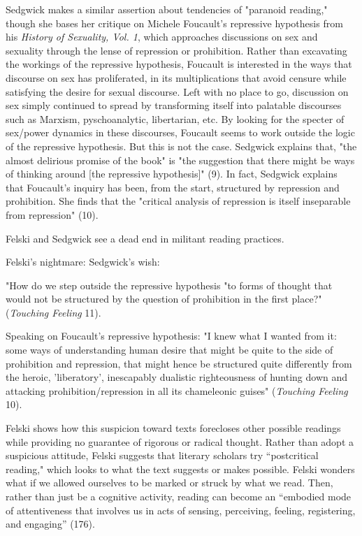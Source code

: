 \documentclass[11pt]{article}
\begin{document}
\begin{enumerate}
Sedgwick makes a similar assertion about tendencies of "paranoid
reading," though she bases her critique on Michele Foucault's
repressive hypothesis from his \emph{History of Sexuality, Vol. 1}, which
approaches discussions on sex and sexuality through the lense of
repression or prohibition. Rather than excavating the workings of the
repressive hypothesis, Foucault is interested in the ways that
discourse on sex has proliferated, in its multiplications that avoid
censure while satisfying the desire for sexual discourse. Left with no
place to go, discussion on sex simply continued to spread by
transforming itself into palatable discourses such as Marxism,
pyschoanalytic, libertarian, etc. By looking for the specter of
sex/power dynamics in these discourses, Foucault seems to work outside
the logic of the repressive hypothesis. But this is not the
case. Sedgwick explains that, "the almost delirious promise of the
book" is "the suggestion that there might be ways of thinking around
[the repressive hypothesis]" (9). In fact, Sedgwick explains that
Foucault's inquiry has been, from the start, structured by repression
and prohibition. She finds that the "critical analysis of repression
is itself inseparable from repression" (10). 

Felski and Sedgwick see a dead end in militant reading practices. 

Felski's nightmare: 
Sedgwick's wish: 

"How do we step outside the repressive hypothesis "to forms of thought
that would not be structured by the question of prohibition in the
first place?" (\emph{Touching Feeling} 11).

Speaking on Foucault's repressive hypothesis: "I knew what I wanted
from it: some ways of understanding human desire that might be quite
to the side of prohibition and repression, that might hence be
structured quite differently from the heroic, 'liberatory',
inescapably dualistic righteousness of hunting down and attacking
prohibition/repression in all its chameleonic guises" (\emph{Touching
Feeling} 10).

Felski shows how this suspicion toward texts forecloses other possible
readings while providing no guarantee of rigorous or radical
thought. Rather than adopt a suspicious attitude, Felski suggests that
literary scholars try “postcritical reading," which looks to what the
text suggests or makes possible. Felski wonders what if we allowed
ourselves to be marked or struck by what we read. Then, rather than
just be a cognitive activity, reading can become an “embodied mode of
attentiveness that involves us in acts of sensing, perceiving,
feeling, registering, and engaging” (176).


\end{enumerate}
\end{document}
